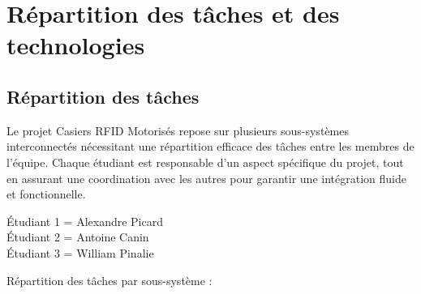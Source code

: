 \documentclass[main.tex]{subfiles}
\begin{document}
\section{Répartition des tâches et des technologies}

\subsection{Répartition des tâches}

\quad Le projet Casiers RFID Motorisés repose sur plusieurs sous-systèmes interconnectés nécessitant une répartition efficace des tâches entre les membres de l’équipe. Chaque étudiant est responsable d’un aspect spécifique du projet, tout en assurant une coordination avec les autres pour garantir une intégration fluide et fonctionnelle.

Étudiant 1 = Alexandre Picard \\
Étudiant 2 = Antoine Canin \\
Étudiant 3 = William Pinalie

Répartition des tâches par sous-système :

\renewcommand{\arraystretch}{1.5}
\setlength{\tabcolsep}{6pt}
\end{document}
